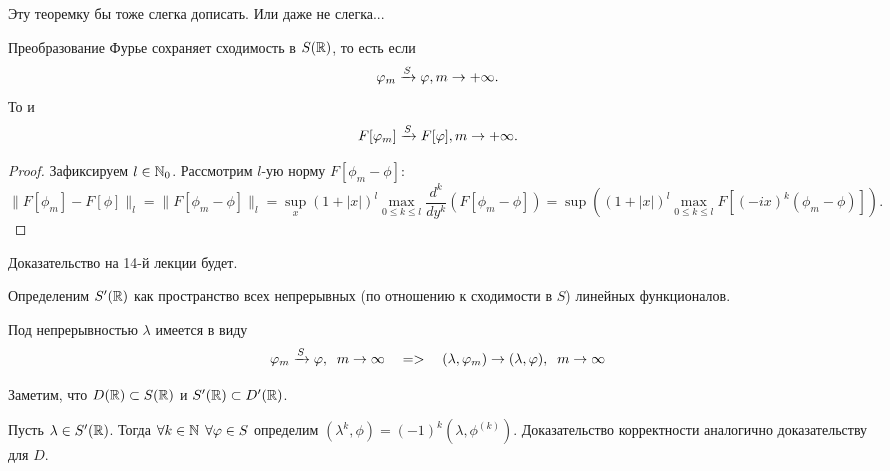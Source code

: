 \begin{note}
    Эту теоремку бы тоже слегка дописать.
    Или даже не слегка...
\end{note}
\begin{theorem}
    Преобразование Фурье сохраняет сходимость в $S(\mathbb{R})$, то есть если
    \[
        \varphi_m \xrightarrow{S} \varphi, m \rightarrow +\infty.
    \]
    То и
    \[
        F[\varphi_m] \xrightarrow{S} F[\varphi], m \rightarrow +\infty.
    \]
\end{theorem}
\begin{proof}
    Зафиксируем $l \in \mathbb{N}_0$.
    Рассмотрим $l$-ую норму $F[\phi_m - \phi]$:
    \[
        \|F[\phi_m] - F[\phi]\|_{l} = \|F[\phi_m - \phi]\|_{l} = \sup \limits_x (1 + |x|)^l \max\limits_{0 \leq k \leq l} \dfrac{d^k}{dy^k}(F[\phi_m - \phi]) = \sup ((1 + |x|)^l \max\limits_{0 \leq k \leq l} F[(-ix)^k(\phi_m - \phi)]).
    \]
\end{proof}
\begin{note}
    Доказательство на 14-й лекции будет.
\end{note}
\begin{definition}
    Определеним $S'(\mathbb{R})$ как пространство всех непрерывных (по отношению к сходимости в $S$) линейных функционалов.
\end{definition}
\begin{note}
    Под непрерывностью $\lambda$ имеется в виду
    \[ \varphi_m \xrightarrow{S} \varphi, \;\; m \rightarrow \infty \quad => \quad (\lambda, \varphi_m) \rightarrow (\lambda, \varphi), \;\; m \rightarrow \infty
    \]
\end{note}
\begin{note}
    Заметим, что $D(\mathbb{R}) \subset S(\mathbb{R})$ и $S'(\mathbb{R}) \subset D'(\mathbb{R})$.
\end{note}
\begin{definition}
    Пусть $\lambda \in S'(\mathbb{R})$.
    Тогда $\forall k \in \mathbb{N} \;\, \forall \varphi \in S$ определим $(\lambda^k, \phi) = (-1)^k (\lambda, \phi^{(k)})$.
    Доказательство корректности аналогично доказательству для $D$.
\end{definition}
